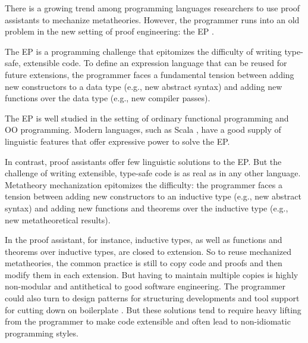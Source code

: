 
There is a growing trend among programming languages researchers
to use proof assistants to mechanize meta\-theories.
%
However, the programmer runs into an old problem
in the new setting of proof engineering:
the \ac{EP} \cite{wadler-ep}.

The EP is a programming challenge that
epitomizes the difficulty of writing type-safe, extensible code.
To define an expression language that can be reused for future extensions,
the programmer faces a fundamental tension \cite{reynolds1975} between
adding new constructors to a data type (e.g., new abstract syntax) and
adding new functions over the data type (e.g., new compiler passes).

The EP is well studied in the setting of ordinary functional
programming and \ac{OO} programming.
Modern languages, such as Scala \cite{scala-oopsla05}, have a good
supply of linguistic features that offer expressive power to solve the
EP. %

In contrast, proof assistants offer few linguistic solutions to the EP.
But the challenge of writing extensible, type-safe code is
as real as in any other language.
Metatheory mechanization epitomizes the difficulty:
the programmer faces a tension between adding new constructors to an inductive type
(e.g., new abstract syntax) and adding new functions and theorems over
the inductive type (e.g., new meta\-theoretical results).

In the \citeauthor{coq} proof assistant, for instance, inductive types, as well as functions and
theorems over inductive types, are closed to extension.
So to reuse mechanized metatheories,
the common practice is still to copy code and proofs and then modify them in each extension.
But having to maintain multiple copies is highly non-modular and
antithetical to good software engineering.
%
The programmer could also turn to design patterns for structuring developments
and tool support for cutting down on boilerplate
\cite{delaware2011,delaware2013,schwaab2013modular,keuchel2013generic,forsta2020}.
But these solutions tend to require heavy lifting from the programmer to make code
extensible and often lead to non-idiomatic programming styles.

